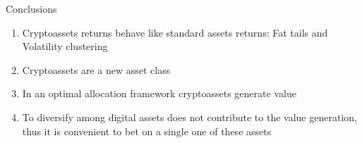 \documentclass[c, 10pt]{beamer}
\begin{document}
{
	\begin{frame}{Conclusions}
	\begin{enumerate}
		\item Cryptoassets returns behave like standard assets returns: Fat tails and Volatility clustering 
		\bigskip
			
		\item Cryptoassets are a new asset class
		\bigskip
		
		\item In an optimal allocation framework cryptoassets generate value
		\bigskip
		
		\item To diversify among digital assets does not contribute to the value generation, thus it is convenient to bet on a single one of these assets
	\end{enumerate}	
    \end{frame}
}
\end{document}
